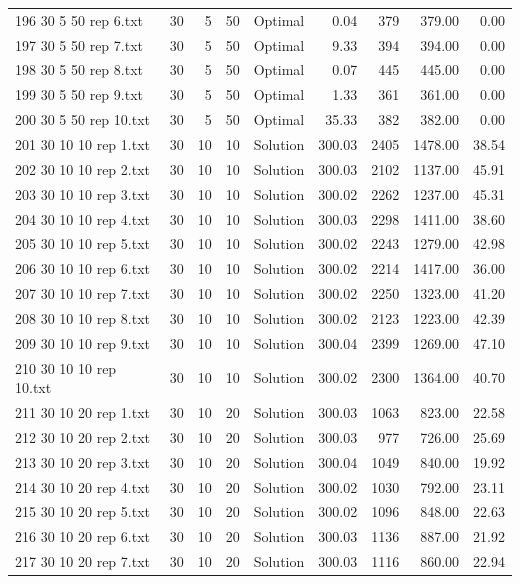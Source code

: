 \begin{longtable}{lrrllrrrr}
196 30 5 50 rep 6.txt & 30 & 5 & 50 & Optimal &  0.04 & 379 & 379.00 &  0.00\\
197 30 5 50 rep 7.txt & 30 & 5 & 50 & Optimal &  9.33 & 394 & 394.00 &  0.00\\
198 30 5 50 rep 8.txt & 30 & 5 & 50 & Optimal &  0.07 & 445 & 445.00 &  0.00\\
199 30 5 50 rep 9.txt & 30 & 5 & 50 & Optimal &  1.33 & 361 & 361.00 &  0.00\\
200 30 5 50 rep 10.txt & 30 & 5 & 50 & Optimal & 35.33 & 382 & 382.00 &  0.00\\
201 30 10 10 rep 1.txt & 30 & 10 & 10 & Solution & 300.03 & 2405 & 1478.00 & 38.54\\
202 30 10 10 rep 2.txt & 30 & 10 & 10 & Solution & 300.03 & 2102 & 1137.00 & 45.91\\
203 30 10 10 rep 3.txt & 30 & 10 & 10 & Solution & 300.02 & 2262 & 1237.00 & 45.31\\
204 30 10 10 rep 4.txt & 30 & 10 & 10 & Solution & 300.03 & 2298 & 1411.00 & 38.60\\
205 30 10 10 rep 5.txt & 30 & 10 & 10 & Solution & 300.02 & 2243 & 1279.00 & 42.98\\
206 30 10 10 rep 6.txt & 30 & 10 & 10 & Solution & 300.02 & 2214 & 1417.00 & 36.00\\
207 30 10 10 rep 7.txt & 30 & 10 & 10 & Solution & 300.02 & 2250 & 1323.00 & 41.20\\
208 30 10 10 rep 8.txt & 30 & 10 & 10 & Solution & 300.02 & 2123 & 1223.00 & 42.39\\
209 30 10 10 rep 9.txt & 30 & 10 & 10 & Solution & 300.04 & 2399 & 1269.00 & 47.10\\
210 30 10 10 rep 10.txt & 30 & 10 & 10 & Solution & 300.02 & 2300 & 1364.00 & 40.70\\
211 30 10 20 rep 1.txt & 30 & 10 & 20 & Solution & 300.03 & 1063 & 823.00 & 22.58\\
212 30 10 20 rep 2.txt & 30 & 10 & 20 & Solution & 300.03 & 977 & 726.00 & 25.69\\
213 30 10 20 rep 3.txt & 30 & 10 & 20 & Solution & 300.04 & 1049 & 840.00 & 19.92\\
214 30 10 20 rep 4.txt & 30 & 10 & 20 & Solution & 300.02 & 1030 & 792.00 & 23.11\\
215 30 10 20 rep 5.txt & 30 & 10 & 20 & Solution & 300.02 & 1096 & 848.00 & 22.63\\
216 30 10 20 rep 6.txt & 30 & 10 & 20 & Solution & 300.03 & 1136 & 887.00 & 21.92\\
217 30 10 20 rep 7.txt & 30 & 10 & 20 & Solution & 300.03 & 1116 & 860.00 & 22.94\\

\end{longtable}
